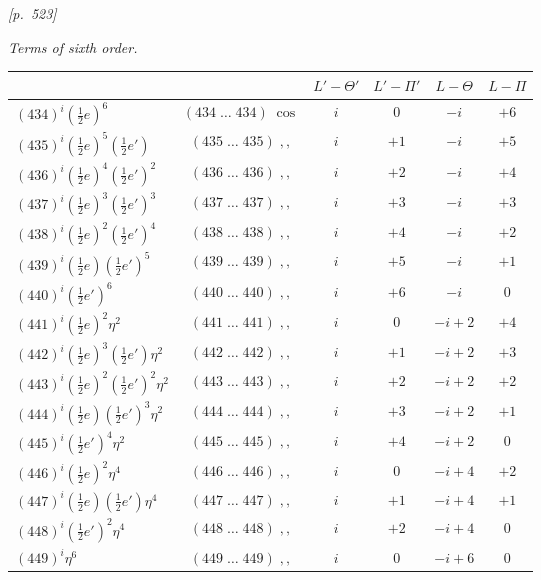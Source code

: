 \documentclass[11pt]{article}
\begin{document}

\newpage
\noindent\textit{[p.~523]}

\medskip

\begin{center}
\textit{Terms of sixth order.}
\end{center}

\smallskip

\begin{center}
\begin{tabular}{|l|c|c|c|c|c|}
\hline
 & & $L'-\Theta'$ & $L'-\Pi'$ & $L-\Theta$ & $L-\Pi$ \\
\hline
$(434)^i(\tfrac{1}{2}e)^6$ & $(434\;\ldots\;434)\;\cos$ & $i$ & $0$ & $-i$ & $+6$ \\
$(435)^i(\tfrac{1}{2}e)^5(\tfrac{1}{2}e')$ & $(435\;\ldots\;435)\;,,$ & $i$ & $+1$ & $-i$ & $+5$ \\
$(436)^i(\tfrac{1}{2}e)^4(\tfrac{1}{2}e')^2$ & $(436\;\ldots\;436)\;,,$ & $i$ & $+2$ & $-i$ & $+4$ \\
$(437)^i(\tfrac{1}{2}e)^3(\tfrac{1}{2}e')^3$ & $(437\;\ldots\;437)\;,,$ & $i$ & $+3$ & $-i$ & $+3$ \\
$(438)^i(\tfrac{1}{2}e)^2(\tfrac{1}{2}e')^4$ & $(438\;\ldots\;438)\;,,$ & $i$ & $+4$ & $-i$ & $+2$ \\
$(439)^i(\tfrac{1}{2}e)(\tfrac{1}{2}e')^5$ & $(439\;\ldots\;439)\;,,$ & $i$ & $+5$ & $-i$ & $+1$ \\
$(440)^i(\tfrac{1}{2}e')^6$ & $(440\;\ldots\;440)\;,,$ & $i$ & $+6$ & $-i$ & $0$ \\
$(441)^i(\tfrac{1}{2}e)^2\eta^2$ & $(441\;\ldots\;441)\;,,$ & $i$ & $0$ & $-i+2$ & $+4$ \\
$(442)^i(\tfrac{1}{2}e)^3(\tfrac{1}{2}e')\eta^2$ & $(442\;\ldots\;442)\;,,$ & $i$ & $+1$ & $-i+2$ & $+3$ \\
$(443)^i(\tfrac{1}{2}e)^2(\tfrac{1}{2}e')^2\eta^2$ & $(443\;\ldots\;443)\;,,$ & $i$ & $+2$ & $-i+2$ & $+2$ \\
$(444)^i(\tfrac{1}{2}e)(\tfrac{1}{2}e')^3\eta^2$ & $(444\;\ldots\;444)\;,,$ & $i$ & $+3$ & $-i+2$ & $+1$ \\
$(445)^i(\tfrac{1}{2}e')^4\eta^2$ & $(445\;\ldots\;445)\;,,$ & $i$ & $+4$ & $-i+2$ & $0$ \\
$(446)^i(\tfrac{1}{2}e)^2\eta^4$ & $(446\;\ldots\;446)\;,,$ & $i$ & $0$ & $-i+4$ & $+2$ \\
$(447)^i(\tfrac{1}{2}e)(\tfrac{1}{2}e')\eta^4$ & $(447\;\ldots\;447)\;,,$ & $i$ & $+1$ & $-i+4$ & $+1$ \\
$(448)^i(\tfrac{1}{2}e')^2\eta^4$ & $(448\;\ldots\;448)\;,,$ & $i$ & $+2$ & $-i+4$ & $0$ \\
$(449)^i\eta^6$ & $(449\;\ldots\;449)\;,,$ & $i$ & $0$ & $-i+6$ & $0$ \\
\hline
\end{tabular}
\end{center}
\end{document}
